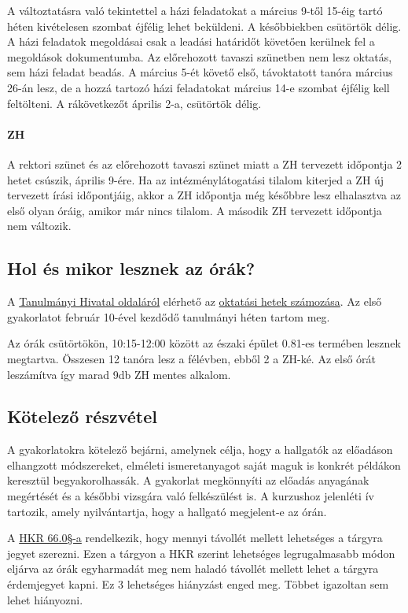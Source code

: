 \documentclass[12pt,a4paper]{scrartcl}
\begin{document}
A változtatásra való tekintettel a házi feladatokat a március 9-től 15-éig tartó héten kivételesen szombat éjfélig lehet beküldeni. A későbbiekben csütörtök délig. A házi feladatok megoldásai csak a leadási határidőt követően kerülnek fel a megoldások dokumentumba. Az előrehozott tavaszi szünetben nem lesz oktatás, sem házi feladat beadás. A március 5-ét követő első, távoktatott tanóra március 26-án lesz, de a hozzá tartozó házi feladatokat március 14-e szombat éjfélig kell feltölteni. A rákövetkezőt április 2-a, csütörtök délig.

\paragraph{ZH}
A rektori szünet és az előrehozott tavaszi szünet miatt a ZH tervezett időpontja 2 hetet csúszik, április 9-ére. Ha az intézménylátogatási tilalom kiterjed a ZH új tervezett írási időpontjáig, akkor a ZH időpontja még későbbre lesz elhalasztva az első olyan óráig, amikor már nincs tilalom. A második ZH tervezett időpontja nem változik.

\subsection{Hol és mikor lesznek az órák?}
A \href{http://to.ttk.elte.hu}{Tanulmányi Hivatal oldaláról} elérhető az \href{http://to.ttk.elte.hu/sites/default/files/201920_1_2fev_oktatasihetek_22.xls}{oktatási hetek számozása}. Az első gyakorlatot február 10-ével kezdődő tanulmányi héten tartom meg.

Az órák csütörtökön, 10:15-12:00 között az északi épület 0.81-es termében lesznek megtartva. Összesen 12 tanóra lesz a félévben, ebből 2 a ZH-ké. Az első órát leszámítva így marad 9db ZH mentes alkalom.

\subsection{Kötelező részvétel}
A gyakorlatokra kötelező bejárni, amelynek célja, hogy a hallgatók az előadáson elhangzott módszereket, elméleti ismeretanyagot saját maguk is konkrét példákon keresztül begyakorolhassák. A gyakorlat megkönnyíti az előadás anyagának megértését és a későbbi vizsgára való felkészülést is. A kurzushoz jelenléti ív tartozik, amely nyilvántartja, hogy a hallgató megjelent-e az órán.

A \href{https://www.elte.hu/file/ELTE_SZMSZ_II.pdf#page=59}{HKR 66.0§-a} rendelkezik, hogy mennyi távollét mellett lehetséges a tárgyra jegyet szerezni. Ezen a tárgyon a HKR szerint lehetséges legrugalmasabb módon eljárva az órák egyharmadát meg nem haladó távollét mellett lehet a tárgyra érdemjegyet kapni. Ez 3 lehetséges hiányzást enged meg. Többet igazoltan sem lehet hiányozni.
\end{document}

